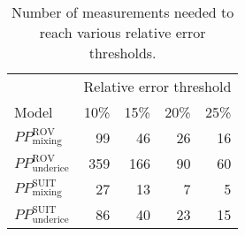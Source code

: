 \documentclass[draft]{agujournal2018}
\begin{document}
\begin{table}[ht]
	\centering
	\begin{tabular}{lrrrr}
	  \toprule
	  & \multicolumn{4}{c}{Relative error threshold} \\
	 Model & 10\% & 15\% & 20\% & 25\% \\
	 \midrule
	$PP^{\mathrm{ROV}}_{\mathrm{mixing}}$ & 99 & 46 & 26 & 16 \\ 
	  $PP^{\mathrm{ROV}}_{\mathrm{underice}}$ & 359 & 166 & 90 & 60 \\ 
	  $PP^{\mathrm{SUIT}}_{\mathrm{mixing}}$ & 27 & 13 & 7 & 5 \\ 
	  $PP^{\mathrm{SUIT}}_{\mathrm{underice}}$ & 86 & 40 & 23 & 15 \\ 
	   \bottomrule
	\end{tabular}
	\caption{Number of measurements needed to reach various relative error thresholds.} 
	\end{table}

\clearpage
\newpage


%

\end{document}
